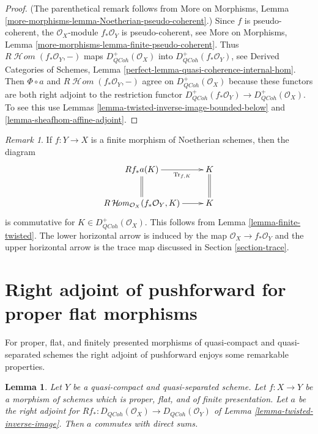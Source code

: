 \documentclass{stacks-project}
\theoremstyle{plain}
\newtheorem{lemma}[subsection]{Lemma}
\theoremstyle{definition}
\theoremstyle{remark}
\newtheorem{remark}[subsection]{Remark}
\numberwithin{equation}{subsection}
\def\SheafHom{\mathop{\mathcal{H}\!\mathit{om}}\nolimits}
\def\QCoh{\mathit{QCoh}}
\begin{document}
\begin{proof}
(The parenthetical remark follows from More on Morphisms, Lemma
\ref{more-morphisms-lemma-Noetherian-pseudo-coherent}.)
Since $f$ is pseudo-coherent, the $\mathcal{O}_X$-module $f_*\mathcal{O}_Y$
is pseudo-coherent, see More on Morphisms, Lemma
\ref{more-morphisms-lemma-finite-pseudo-coherent}.
Thus $R\SheafHom(f_*\mathcal{O}_Y, -)$ maps
$D_\QCoh^+(\mathcal{O}_X)$ into
$D_\QCoh^+(f_*\mathcal{O}_Y)$, see
Derived Categories of Schemes, Lemma
\ref{perfect-lemma-quasi-coherence-internal-hom}.
Then $\Phi \circ a$ and $R\SheafHom(f_*\mathcal{O}_Y, -)$
agree on $D_\QCoh^+(\mathcal{O}_X)$ because these functors are
both right adjoint to the restriction functor
$D_\QCoh^+(f_*\mathcal{O}_Y) \to D_\QCoh^+(\mathcal{O}_X)$. To see this
use Lemmas \ref{lemma-twisted-inverse-image-bounded-below} and
\ref{lemma-sheafhom-affine-adjoint}.
\end{proof}

\begin{remark}
\label{remark-trace-map-finite}
If $f : Y \to X$ is a finite morphism of Noetherian schemes, then the diagram
$$
\xymatrix{
Rf_*a(K) \ar[r]_-{\text{Tr}_{f, K}} \ar@{=}[d] & K \ar@{=}[d] \\
R\SheafHom_{\mathcal{O}_X}(f_*\mathcal{O}_Y, K) \ar[r] & K
}
$$
is commutative for $K \in D_\QCoh^+(\mathcal{O}_X)$. This follows
from Lemma \ref{lemma-finite-twisted}. The lower horizontal
arrow is induced by the map $\mathcal{O}_X \to f_*\mathcal{O}_Y$ and the
upper horizontal arrow is the trace map discussed in
Section \ref{section-trace}.
\end{remark}






\section{Right adjoint of pushforward for proper flat morphisms}
\label{section-proper-flat}

\noindent
For proper, flat, and finitely presented morphisms of quasi-compact
and quasi-separated schemes the right adjoint of pushforward
enjoys some remarkable properties.

\begin{lemma}
\label{lemma-proper-flat}
Let $Y$ be a quasi-compact and quasi-separated scheme.
Let $f : X \to Y$ be a morphism of schemes which is proper, flat, and
of finite presentation.
Let $a$ be the right adjoint for
$Rf_* : D_\QCoh(\mathcal{O}_X) \to D_\QCoh(\mathcal{O}_Y)$ of
Lemma \ref{lemma-twisted-inverse-image}. Then $a$ commutes with direct sums.
\end{lemma}
\end{document}
